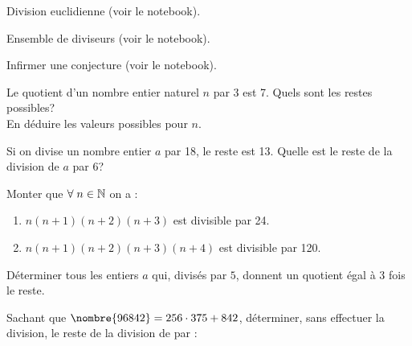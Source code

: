 \begin{exstheorie}
\exordi Division euclidienne (voir le notebook).



\exordi Ensemble de diviseurs (voir le notebook).


\exordi Infirmer une conjecture  (voir le notebook).

\eexo
\exo
Le quotient d'un nombre entier naturel $n$ par 3 est 7. Quels sont les restes possibles?\\
En déduire les valeurs possibles pour $n$.




\eexo
\pagebreak[1]





\exo
Si on divise un nombre entier $a$ par 18, le reste est 13. Quelle est le reste de la division de $a$ par 6?





\eexo
\pagebreak[2]





\exo
Monter que $\forall\; n\in \mathbb{N}$ on a :
\begin{enumerate}[label=\alph*),left=0mm]
\item $n(n+1)(n+2)(n+3)$ est divisible par 24.
\item $n(n+1)(n+2)(n+3)(n+4)$ est divisible par 120.
\end{enumerate}






\eexo
\pagebreak[3]





\exo
Déterminer tous les entiers $a$ qui, divisés par $5$, donnent un quotient égal à 3 fois le reste.





\eexo
\pagebreak[3]





\exo
Sachant que $\nombre{96842}=256 \cdot 375+842$, déterminer, sans effectuer la division, le reste de la division de  par :


\end{exstheorie}
